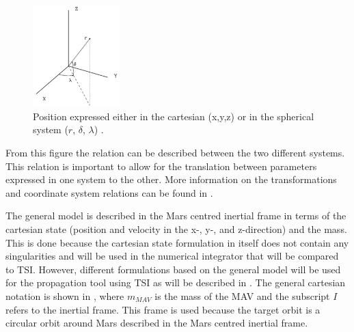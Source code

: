 \begin{figure}[H]
\centering
\includegraphics[width=0.3\textwidth]{figures/reference_frames/sphertocart_noomen2013basic.jpg}
\caption{Position expressed either in the cartesian (x,y,z) or in the spherical system ($r$, $\delta$, $\lambda$) \citep{noomen2013basic}.}
\label{fig:sphertocart_noomen2013basicFirst}
\end{figure}

\noindent
From this figure the relation can be described between the two different systems. This relation is important to allow for the translation between parameters expressed in one system to the other. More information on the transformations and coordinate system relations can be found in .
%
%


The general model is described in the Mars centred inertial frame in terms of the cartesian state (position and velocity in the x-, y-, and z-direction) and the mass. This is done because the cartesian state formulation in itself does not contain any singularities and will be used in the numerical integrator that will be compared to \ac{TSI}. However, different formulations based on the general model will be used for the propagation tool using \ac{TSI} as will be described in . The general cartesian notation is shown in , where $m_{MAV}$ is the mass of the \ac{MAV} and the subscript $I$ refers to the inertial frame. This frame is used because the target orbit is a circular orbit around Mars described in the Mars centred inertial frame.


